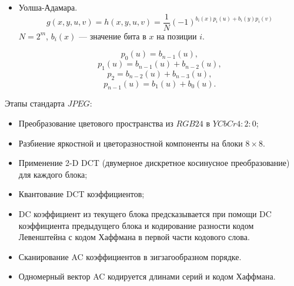 {\begin{itemize}
\[        \]


        Имели на входе 4 * 4 = 16 значений, в идеальном случае, когда все
        значения одинаковые, получили 1 коэффициент преобразования.


        После удаления 90\% коэффициентов с наименьшей амплитудой:


        В блоке наиболее значимые коэффициенты сконцентрированы в углу. Это
        свойство можно использовать при кодировании. Преобразуем двумерный блок
        в одномерный вектор так, что в начале будут идти значимые значения, а
        остальные передавать не будем.

    \item Уолша-Адамара.
        \[
            g(x, y, u, v) = h(x, y, u, v) = \frac{1}{N}(-1)^{b_i(x)p_i(u) +
            b_i(y)p_i(v)}
        \]
        $N = 2^m$, $b_i(x)$ --- значение бита в $x$ на позиции $i$.

        \[
            p_0(u) = b_{n-1}(u),
        \]
        \[
            p_1(u) = b_{n-1}(u) + b_{n-2}(u),
        \]
        \[
            p_2 = b_{n-2}(u) + b_{n-3}(u),
        \]
        \[
            p_{n-1}(u) = b_1(u) + b_0(u).
        \]
\end{itemize}


Этапы стандарта $JPEG$:
\begin{itemize}
    \item Преобразование цветового пространства из $RGB24$ в $YCbCr 4:2:0$;

    \item Разбиение яркостной и цветоразностной компоненты на блоки $8 \times
        8$.

    \item Применение 2-D DCT (двумерное дискретное косинусное преобразование) для  каждого блока;

    \item Квантование DCT коэффициентов;

    \item DC коэффициент из текущего блока предсказывается при помощи DC
        коэффициента предыдущего блока и кодирование разности кодом Левенштейна
        с кодом Хаффмана в первой части кодового слова.

    \item Сканирование AC коэффициентов в зигзагообразном порядке.

    \item Одномерный вектор AC кодируется длинами серий и кодом Хаффмана.
\end{itemize}

}
